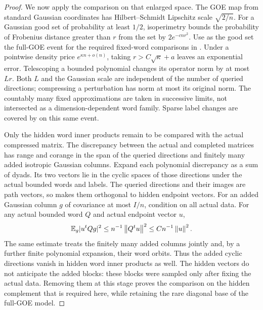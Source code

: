 \begin{proof}
We now apply the comparison on that enlarged space.  The GOE map from
standard Gaussian coordinates has Hilbert--Schmidt Lipschitz scale
$\sqrt{2/n}$.  For a Gaussian good set of probability at least $1/2$,
isoperimetry bounds the probability of Frobenius distance greater than
$r$ from the set by $2e^{-cnr^2}$.  Use as the good set the full-GOE
event for the required fixed-word comparisons in
.
Under a pointwise density price $e^{\kappa n+o(n)}$, taking
$r>C\sqrt\kappa+a$ leaves an exponential error. Telescoping a bounded
polynomial changes its operator norm by at most $Lr$. Both $L$ and the
Gaussian scale are independent of the number of queried directions;
compressing a perturbation has norm at most its original norm. The
countably many fixed approximations are taken in successive limits,
not intersected as a dimension-dependent word family. Sparse label
changes are covered by  on this same event.

Only the hidden word inner products remain to be compared with the
actual compressed matrix.  The discrepancy between the actual and
completed matrices has range and corange in the span of the queried
directions and finitely many added isotropic Gaussian columns.
Expand each polynomial discrepancy as a sum of dyads.  Its two
vectors lie in the cyclic spaces of those directions under the actual
bounded words and labels. The queried
directions and their images are path vectors, so
 makes them orthogonal to hidden endpoint
vectors. For an added Gaussian column $g$ of covariance at most $I/n$,
condition on all actual data. For any actual bounded word $Q$ and
actual endpoint vector $u$,
\[
 \mathbb E_g|u^tQg|^2\le n^{-1}\left\lVert Q^tu\right\rVert^2
                    \le Cn^{-1}\left\lVert u\right\rVert^2.
\]
The same estimate treats the finitely many added columns jointly and,
by a further finite polynomial expansion, their word orbits. Thus the
added cyclic directions vanish in hidden word inner products as well.
The hidden vectors do not anticipate the added blocks: these blocks
were sampled only after fixing the actual data. Removing them at this
stage proves the comparison on the hidden complement that is required
here, while retaining the rare diagonal base of the full-GOE model.


\end{proof}
